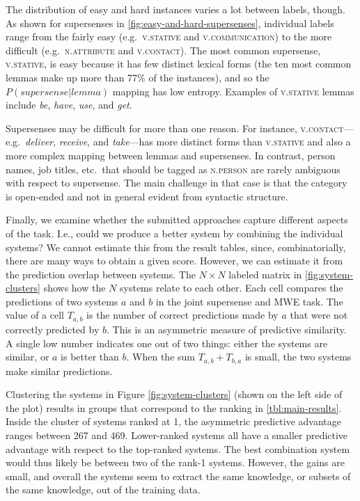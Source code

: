 \documentclass[11pt,letterpaper]{article}
\begin{document}
The distribution of easy and hard instances varies a lot between labels, though. 
As shown for supersenses in \cref{fig:easy-and-hard-supersenses}, 
individual labels range from the fairly easy (e.g.\ \textsc{v.stative} and \textsc{v.communication}) 
to the more difficult (e.g.\ \textsc{n.attribute} and \textsc{v.contact}). 
The most common supersense, \textsc{v.stative}, is easy because it has few distinct lexical forms 
(the ten most common lemmas make up more than 77\% of the instances), and so the
$P(\textit{supersense} | \textit{lemma})$ mapping has low entropy. 
Examples of \textsc{v.stative} lemmas include \emph{be}, \emph{have}, \emph{use}, and \emph{get}. 

Supersenses may be difficult for more than one reason. 
For instance, \textsc{v.contact}---e.g.\ \emph{deliver}, \emph{receive}, and \emph{take}---has more distinct forms 
than \textsc{v.stative} and also a more complex mapping between lemmas and supersenses. 
In contrast, person names, job titles, etc.\ that should be tagged as \textsc{n.person} are rarely ambiguous
with respect to supersense. The main challenge in that case is that the category is open-ended 
and not in general evident from syntactic structure.

Finally, we examine whether the submitted approaches capture different aspects of the task. 
I.e., could we produce a better system by combining the individual systems? 
We cannot estimate this from the result tables, since, combinatorially, 
there are many ways to obtain a given score. 
However, we can estimate it from the prediction overlap between systems.
The $N \times N$ labeled matrix in \cref{fig:system-clusters} 
shows how the $N$ systems relate to each other. 
Each cell compares the predictions of two systems $a$ and $b$ in the joint supersense and MWE task. 
The value of a cell $T_{a,b}$ is the number of correct predictions made by $a$ 
that were not correctly predicted by $b$. This is an asymmetric measure of predictive similarity. 
A single low number indicates one out of two things: either the systems are similar, or $a$ is better than $b$. 
When the sum $T_{a,b} + T_{b,a}$ is small, the two systems make similar predictions. 

Clustering the systems in Figure \ref{fig:system-clusters} (shown on the left side of the plot) 
results in groups that correspond to the ranking in \cref{tbl:main-results}. 
Inside the cluster of systems ranked at 1, the asymmetric predictive advantage ranges between 267 and 469. 
Lower-ranked systems all have a smaller predictive advantage with respect to the top-ranked systems. 
The best combination system would thus likely be between two of the rank-1 systems. 
However, the gains are small, and overall the systems seem to extract the same knowledge, 
or subsets of the same knowledge, out of the training data. 
\end{document}
